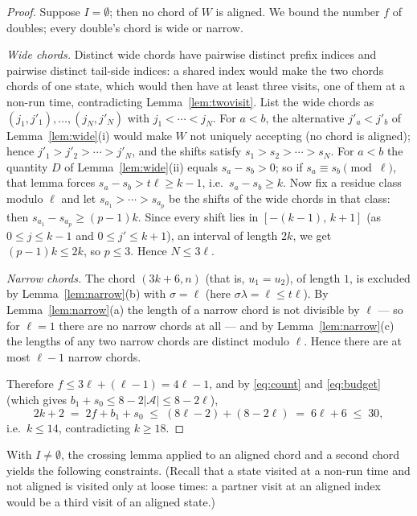 \documentclass[11pt]{article}
\theoremstyle{definition}
\begin{document}
\begin{proof}
Suppose $I=\emptyset$; then no chord of $W$ is aligned. We bound the number
$f$ of doubles; every double's chord is wide or narrow.

\emph{Wide chords.} Distinct wide chords have pairwise distinct prefix
indices and pairwise distinct tail-side indices: a shared index would make
the two chords chords of one state, which would then have at least three
visits, one of them at a non-run time, contradicting
Lemma~\ref{lem:twovisit}. List the wide chords as
$(j_1,j'_1),\dots,(j_N,j'_N)$ with $j_1<\cdots<j_N$. For $a<b$, the
alternative $j'_a<j'_b$ of Lemma~\ref{lem:wide}(i) would make $W$ not
uniquely accepting (no chord is aligned); hence $j'_1>j'_2>\cdots>j'_N$, and
the shifts satisfy $s_1>s_2>\cdots>s_N$. For $a<b$ the quantity $D$ of
Lemma~\ref{lem:wide}(ii) equals $s_a-s_b>0$; so if $s_a\equiv s_b\pmod\ell$,
that lemma forces $s_a-s_b>t\ell\ge k-1$, i.e.\ $s_a-s_b\ge k$. Now fix a
residue class modulo $\ell$ and let $s_{a_1}>\cdots>s_{a_p}$ be the shifts
of the wide chords in that class: then $s_{a_1}-s_{a_p}\ge(p-1)k$. Since
every shift lies in $[-(k-1),\,k+1]$ (as $0\le j\le k-1$ and
$0\le j'\le k+1$), an interval of length $2k$, we get $(p-1)k\le 2k$, so
$p\le3$. Hence $N\le 3\ell$.

\emph{Narrow chords.} The chord $(3k+6,n)$ (that is, $u_1=u_2$), of length
$1$, is excluded by Lemma~\ref{lem:narrow}(b) with $\sigma=\ell$ (here
$\sigma\lambda=\ell\le t\ell$). By Lemma~\ref{lem:narrow}(a) the length of a
narrow chord is not divisible by $\ell$ --- so for $\ell=1$ there are no
narrow chords at all --- and by Lemma~\ref{lem:narrow}(c) the lengths of any
two narrow chords are distinct modulo $\ell$. Hence there are at most
$\ell-1$ narrow chords.

Therefore $f\le 3\ell+(\ell-1)=4\ell-1$, and by \eqref{eq:count} and
\eqref{eq:budget} (which gives $b_1+s_0\le 8-2|\mathcal A|\le 8-2\ell$),
\[
2k+2\;=\;2f+b_1+s_0\;\le\;(8\ell-2)+(8-2\ell)\;=\;6\ell+6\;\le\;30,
\]
i.e.\ $k\le14$, contradicting $k\ge18$.
\end{proof}

With $I\ne\emptyset$, the crossing lemma applied to an aligned chord and a
second chord yields the following constraints. (Recall that a state visited at
a non-run time and not aligned is visited only at loose times: a partner visit
at an aligned index would be a third visit of an aligned state.)
\end{document}
